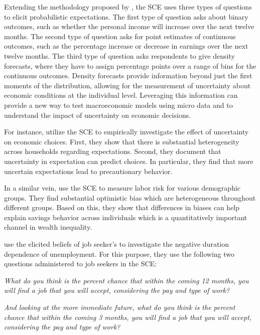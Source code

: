 \documentclass[11pt,a4paper,leqno]{article}
\begin{document}
Extending the methodology proposed by \textcite{Manski}, the SCE uses three types of questions to elicit probabilistic expectations. The first type of question asks about binary outcomes, such as whether the personal income will increase over the next twelve months. The second type of question asks for point estimates of continuous outcomes, such as the percentage increase or decrease in earnings over the next twelve months. The third type of question asks respondents to give density forecasts, where they have to assign percentage points over a range of bins for the continuous outcomes. Density forecasts provide information beyond just the first moments of the distribution, allowing for the measurement of uncertainty about economic conditions at the individual level. Leveraging this information can provide a new way to test macroeconomic models using micro data and to understand the impact of uncertainty on economic decisions. 

For instance, \textcite{BFKL2018} utilize the SCE to empirically investigate the effect of uncertainty on economic choices. First, they show that there is substantial heterogeneity across households regarding expectations. Second, they document that uncertainty in expectation can predict choices. In particular, they find that more uncertain expectations lead to precautionary behavior. 

In a similar vein, \textcite{Baleer2021} use the SCE to measure labor risk for various demographic groups. They find substantial optimistic bias which are heterogeneous throughout different groups. Based on this, they show that differences in biases can help explain savings behavior across individuals which is a quantitatively important channel in wealth inequality. 

\textcite{MST2021} use the elicited beliefs of job seeker's to investigate the negative duration dependence of unemployment. For this purpose, they use the following two questions administered to job seekers in the SCE:
\begin{center}
	\textit{What do you think is the percent chance that within the coming 12 months, you will find a job that you will accept, considering the pay and type of work?}
	\bigskip
	
	\textit{And looking at the more immediate future, what do you think is the percent chance that within the coming 3 months, you will find a job that you will accept, considering the pay and type of work?}
\end{center}
\end{document}
